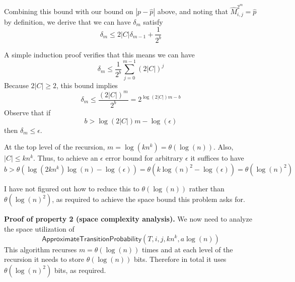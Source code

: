 \documentclass{article}
\begin{document}
Combining this bound with our bound on $|p - \hat{p}|$ above, and noting that $\hat{M}_{i, j}^{2^m} = \hat{p}$ by definition, we derive that we can have $\delta_m$ satisfy
$$
\delta_m \leq 2|C|\delta_{m-1} + \frac{1}{2^b}
$$

A simple induction proof verifies that this means we can have
$$
\delta_m \leq \frac{1}{2^b} \sum_{j=0}^{m-1}(2 |C|)^j
$$
Because $2|C| \geq 2$, this bound implies
$$
\delta_m \leq \frac{(2|C|)^m}{2^b} = 2^{
	\log(2|C|)m - b
}
$$
Observe that if
$$
b > \log(2|C|)m - \log(\epsilon)
$$
then $\delta_m \leq \epsilon$.

At the top level of the recursion, $m = \log(k n^k) = \theta(\log(n))$.
Also, $|C| \leq kn^k$.
Thus, to achieve an $\epsilon$ error bound for arbitrary $\epsilon$ it suffices to have
$$
b > \theta(\log(2kn^k)\log(n) - \log(\epsilon)) = \theta(k\log(n)^2 - \log(\epsilon)) = \theta(\log(n)^2)
$$

I have not figured out how to reduce this to $\theta(\log(n))$ rather than $\theta(\log(n)^2)$, as required to achieve the space bound this problem asks for.

\medskip
\noindent \textbf{Proof of property 2 (space complexity analysis).}
We now need to analyze the space utilization of $$\mathsf{ApproximateTransitionProbability}(T, i, j, kn^k, a \log(n))$$
This algorithm recurses $m = \theta(\log(n))$ times and at each level of the recursion it needs to store $\theta(\log(n))$ bits.
Therefore in total it uses $\theta(\log(n)^2)$ bits, as required.


\end{document}
